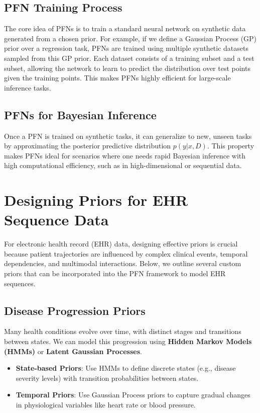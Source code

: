 \documentclass{article}
\begin{document}
\subsection{PFN Training Process}

The core idea of PFNs is to train a standard neural network on synthetic data generated from a chosen prior. For example, if we define a Gaussian Process (GP) prior over a regression task, PFNs are trained using multiple synthetic datasets sampled from this GP prior. Each dataset consists of a training subset and a test subset, allowing the network to learn to predict the distribution over test points given the training points. This makes PFNs highly efficient for large-scale inference tasks.

\subsection{PFNs for Bayesian Inference}

Once a PFN is trained on synthetic tasks, it can generalize to new, unseen tasks by approximating the posterior predictive distribution \( p(y|x, D) \). This property makes PFNs ideal for scenarios where one needs rapid Bayesian inference with high computational efficiency, such as in high-dimensional or sequential data.

\section{Designing Priors for EHR Sequence Data}

For electronic health record (EHR) data, designing effective priors is crucial because patient trajectories are influenced by complex clinical events, temporal dependencies, and multimodal interactions. Below, we outline several custom priors that can be incorporated into the PFN framework to model EHR sequences.

\subsection{Disease Progression Priors}

Many health conditions evolve over time, with distinct stages and transitions between states. We can model this progression using \textbf{Hidden Markov Models (HMMs)} or \textbf{Latent Gaussian Processes}.

\begin{itemize}
    \item \textbf{State-based Priors}: Use HMMs to define discrete states (e.g., disease severity levels) with transition probabilities between states.
    \item \textbf{Temporal Priors}: Use Gaussian Process priors to capture gradual changes in physiological variables like heart rate or blood pressure.
\end{itemize}
\end{document}
